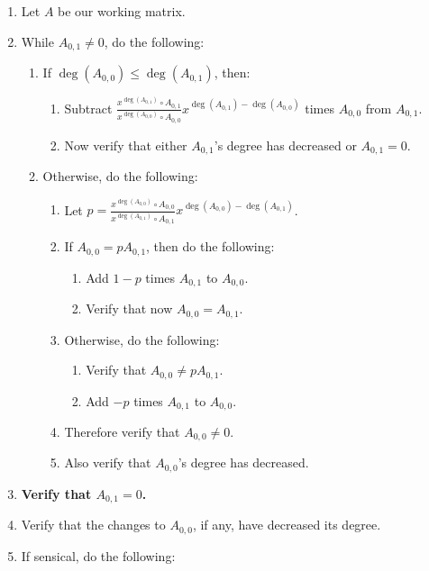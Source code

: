 \documentclass[twocolumn]{article}
\begin{document}
				\begin{enumerate}
					\item Let $A$ be our working matrix.
					\item While $A_{0,1}\ne 0$, do the following:
					\begin{enumerate}
						\item If $\deg(A_{0,0})\le\deg(A_{0,1})$, then:
						\begin{enumerate}
							\item Subtract $\frac{x^{\deg(A_{0,1})}\circ A_{0,1}}{x^{\deg(A_{0,0})}\circ A_{0,0}}x^{\deg(A_{0,1})-\deg(A_{0,0})}$ times $A_{0,0}$ from $A_{0,1}$.
							\item Now verify that either $A_{0,1}$'s degree has decreased or $A_{0,1}=0$.
						\end{enumerate}
						\item Otherwise, do the following:
						\begin{enumerate}
							\item Let $p=\frac{x^{\deg(A_{0,0})}\circ A_{0,0}}{x^{\deg(A_{0,1})}\circ A_{0,1}}x^{\deg(A_{0,0})-\deg(A_{0,1})}$.
							\item If $A_{0,0}=pA_{0,1}$, then do the following:
							\begin{enumerate}
								\item Add $1-p$ times $A_{0,1}$ to $A_{0,0}$.
								\item Verify that now $A_{0,0}=A_{0,1}$.
							\end{enumerate}
							\item Otherwise, do the following:
							\begin{enumerate}
								\item Verify that $A_{0,0}\ne pA_{0,1}$.
								\item Add $-p$ times $A_{0,1}$ to $A_{0,0}$.
							\end{enumerate}
							\item Therefore verify that $A_{0,0}\ne 0$.
							\item Also verify that $A_{0,0}$'s degree has decreased.
						\end{enumerate}
					\end{enumerate}
					\item \textbf{Verify that $A_{0,1}=0$.}
					\item Verify that the changes to $A_{0,0}$, if any, have decreased its degree.
					\item If sensical, do the following:
					\begin{enumerate}

\end{enumerate}
\end{enumerate}
\end{document}
